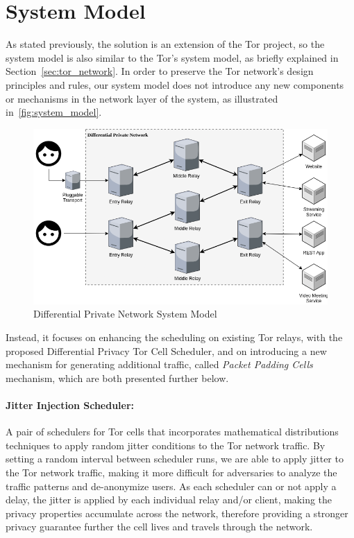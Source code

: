 \section{System Model}\label{sec:system_model}

As stated previously, the solution is an extension of the Tor project, so the system model is also similar to the Tor's system model, as briefly explained in Section~\ref{sec:tor_network}. In order to preserve the Tor network's design principles and rules, our system model does not introduce any new components or mechanisms in the network layer of the system, as illustrated in~\autoref{fig:system_model}. 

\begin{figure}[!h]
  \centering
  \includegraphics[width=\textwidth]{Chapters/Figures/System_Model_Geral.png}
  \caption{Differential Private Network System Model}\label{fig:system_model}
\end{figure}

Instead, it focuses on enhancing the scheduling on existing Tor relays, with the proposed Differential Privacy Tor Cell Scheduler, and on introducing a new mechanism for generating additional traffic, called \textit{Packet Padding Cells} mechanism, which are both presented further below.

\paragraph{Jitter Injection Scheduler:} A pair of schedulers for Tor cells that incorporates mathematical distributions techniques to apply random jitter conditions to the Tor network traffic. By setting a random interval between scheduler runs, we are able to apply jitter to the Tor network traffic, making it more difficult for adversaries to analyze the traffic patterns and de-anonymize users. As each scheduler can or not apply a delay, the jitter is applied by each individual relay and/or client, making the privacy properties accumulate across the network, therefore providing a stronger privacy guarantee further the cell lives and travels through the network.
